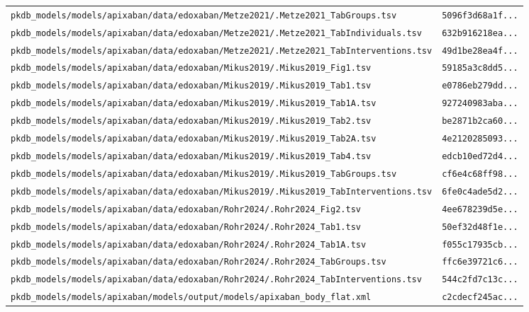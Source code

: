 \documentclass{article}
\begin{document}
\begin{longtable}{ll}
\texttt{pkdb\_models/models/apixaban/data/edoxaban/Metze2021/.Metze2021\_TabGroups.tsv} & \texttt{5096f3d68a1f...} \\
\texttt{pkdb\_models/models/apixaban/data/edoxaban/Metze2021/.Metze2021\_TabIndividuals.tsv} & \texttt{632b916218ea...} \\
\texttt{pkdb\_models/models/apixaban/data/edoxaban/Metze2021/.Metze2021\_TabInterventions.tsv} & \texttt{49d1be28ea4f...} \\
\texttt{pkdb\_models/models/apixaban/data/edoxaban/Mikus2019/.Mikus2019\_Fig1.tsv} & \texttt{59185a3c8dd5...} \\
\texttt{pkdb\_models/models/apixaban/data/edoxaban/Mikus2019/.Mikus2019\_Tab1.tsv} & \texttt{e0786eb279dd...} \\
\texttt{pkdb\_models/models/apixaban/data/edoxaban/Mikus2019/.Mikus2019\_Tab1A.tsv} & \texttt{927240983aba...} \\
\texttt{pkdb\_models/models/apixaban/data/edoxaban/Mikus2019/.Mikus2019\_Tab2.tsv} & \texttt{be2871b2ca60...} \\
\texttt{pkdb\_models/models/apixaban/data/edoxaban/Mikus2019/.Mikus2019\_Tab2A.tsv} & \texttt{4e2120285093...} \\
\texttt{pkdb\_models/models/apixaban/data/edoxaban/Mikus2019/.Mikus2019\_Tab4.tsv} & \texttt{edcb10ed72d4...} \\
\texttt{pkdb\_models/models/apixaban/data/edoxaban/Mikus2019/.Mikus2019\_TabGroups.tsv} & \texttt{cf6e4c68ff98...} \\
\texttt{pkdb\_models/models/apixaban/data/edoxaban/Mikus2019/.Mikus2019\_TabInterventions.tsv} & \texttt{6fe0c4ade5d2...} \\
\texttt{pkdb\_models/models/apixaban/data/edoxaban/Rohr2024/.Rohr2024\_Fig2.tsv} & \texttt{4ee678239d5e...} \\
\texttt{pkdb\_models/models/apixaban/data/edoxaban/Rohr2024/.Rohr2024\_Tab1.tsv} & \texttt{50ef32d48f1e...} \\
\texttt{pkdb\_models/models/apixaban/data/edoxaban/Rohr2024/.Rohr2024\_Tab1A.tsv} & \texttt{f055c17935cb...} \\
\texttt{pkdb\_models/models/apixaban/data/edoxaban/Rohr2024/.Rohr2024\_TabGroups.tsv} & \texttt{ffc6e39721c6...} \\
\texttt{pkdb\_models/models/apixaban/data/edoxaban/Rohr2024/.Rohr2024\_TabInterventions.tsv} & \texttt{544c2fd7c13c...} \\
\texttt{pkdb\_models/models/apixaban/models/output/models/apixaban\_body\_flat.xml} & \texttt{c2cdecf245ac...} \\
\end{longtable}
\end{document}
